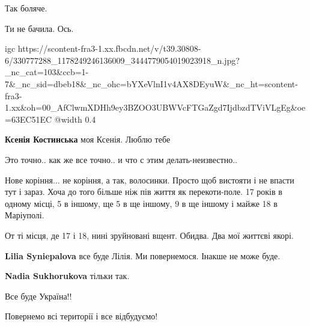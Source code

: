  
 
 
 
 

\qqSecCmt


Так боляче.


Ти не бачила. Ось.

\ifcmt
  igc https://scontent-fra3-1.xx.fbcdn.net/v/t39.30808-6/330777288_1178249246136009_3444779054019023918_n.jpg?_nc_cat=103&ccb=1-7&_nc_sid=dbeb18&_nc_ohc=bYXeVlnI1v4AX8DEyuW&_nc_ht=scontent-fra3-1.xx&oh=00_AfClwmXDHh9ey3BZOO3UBWVcFTGaZgd7IjdbzdTViVLgEg&oe=63EC51EC
	@width 0.4
\fi

\begin{itemize} %
\textbf{Ксенія Костинська} моя Ксенія. Люблю тебе
\end{itemize} %


Это точно.. как же все точно.. и что с этим делать-неизвестно..


Нове коріння... не коріння, а так, волосинки. Просто щоб вистояти і не впасти
тут і зараз. Хоча до того більше ніж пів життя як перекоти-поле. 17 років в
одному місці, 5 в іншому, ще 5 в ще іншому, 9 в ще іншому і майже 18 в
Маріуполі.

От ті місця, де 17 і 18, нині зруйновані вщент. Обидва. Два мої життєві якорі.

\begin{itemize} %
\textbf{Lilia Syniepalova} все буде Лілія. Ми повернемося. Інакше не може буде.

\textbf{Nadia Sukhorukova} тільки так.
\end{itemize} %


Все буде Україна!!

Повернемо всі території і все відбудуємо!



